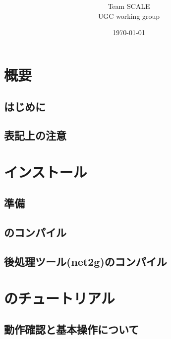\documentclass[a4paper]{jreport}
\title{{\vspace{2cm}{\Large Version \version} }}
\author{\Large Team SCALE\\ UGC working group}
\date{\today}
\begin{document}
\maketitle
\ClearWallPaper
{}
\tableofcontents


\part{概要} \label{part:overview}
 \chapter{はじめに} \label{sec:introduction}
 
 \chapter{表記上の注意} \label{sec:notation}
 

\part{インストール} \label{part:install}
 \chapter{準備}
 
 \chapter{\scalelib のコンパイル}
 
 \chapter{後処理ツール(net2g)のコンパイル}
 

\part{\scalerm のチュートリアル}
\chapter{動作確認と基本操作について} \label{chap:tutorial_ideal}




\end{document}
